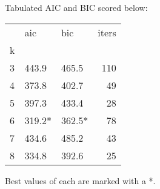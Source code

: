 Tabulated AIC and BIC scored below:
\vspace{4mm}

\begin{tabular}{lllr}
\toprule
{} &     aic &     bic &  iters \\
k &         &         &        \\
\midrule
3 &   443.9 &   465.5 &    110 \\
4 &   373.8 &   402.7 &     49 \\
5 &   397.3 &   433.4 &     28 \\
6 &  319.2* &  362.5* &     78 \\
7 &   434.6 &   485.2 &     43 \\
8 &   334.8 &   392.6 &     25 \\
\bottomrule
\end{tabular}

\vspace{4mm}
\noindent Best values of each are marked with a *.
